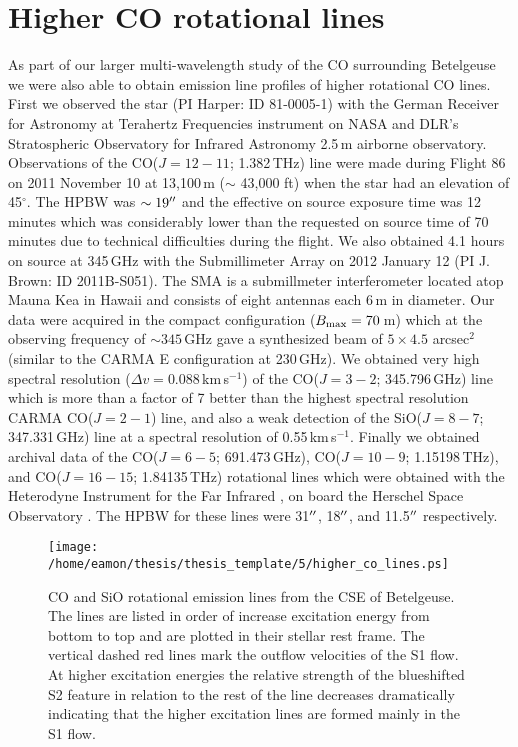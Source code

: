 \section{Higher CO rotational lines}\label{sec:5.10}
As part of our larger multi-wavelength study of the CO surrounding Betelgeuse we were also able to obtain emission line profiles of higher rotational CO lines. First we observed the star (PI Harper: ID 81-0005-1) with the German Receiver for Astronomy at Terahertz Frequencies \cite[GREAT;][]{guesten_2000} instrument on NASA and DLR's Stratospheric Observatory for Infrared Astronomy \cite[SOFIA;][]{becklin_2009} 2.5\,m airborne observatory. Observations of the  CO($J = 12-11$; 1.382\,THz) line were made during Flight 86 on 2011 November 10 at 13,100\,m ($\sim$ 43,000 ft) when the star had an elevation of 45$^{\circ}$. The HPBW was $\sim 19^{\prime\prime}$ and the effective on source exposure time was 12 minutes which was considerably lower than the requested on source time of 70 minutes due to technical difficulties during the flight. We also obtained 4.1 hours on source at 345\,GHz with the Submillimeter Array \cite[SMA;][]{blundell_2007} on 2012 January 12 (PI J. Brown: ID 2011B-S051). The SMA is a submillmeter interferometer located  atop Mauna Kea in Hawaii and consists of eight antennas each 6\,m in diameter. Our data were acquired in the compact configuration ($B_{\rm{max}}=70$\,m) which at the observing frequency of $\sim 345$\,GHz gave a synthesized beam of $5\times 4.5$ arcsec$^2$ (similar to the CARMA E configuration at 230\,GHz). We obtained very high spectral resolution ($\Delta v= 0.088$\,km\,s$^{-1}$) of the CO($J = 3-2$; 345.796\,GHz) line which is more than a factor of 7 better than the highest spectral resolution CARMA CO($J = 2-1$) line, and also a weak detection of the SiO($J = 8-7$; 347.331\,GHz) line at a spectral resolution of 0.55\,km\,s$^{-1}$. Finally we obtained archival data of the CO($J = 6-5$; 691.473\,GHz), CO($J = 10-9$; 1.15198\,THz), and CO($J = 16-15$; 1.84135\,THz) rotational lines which were obtained with the Heterodyne Instrument for the Far Infrared \cite[HIFI;][]{deGraauw_2010}, on board the Herschel Space Observatory \citep{pilbratt_2010}. The HPBW for these lines were 31$^{\prime\prime}$, 18$^{\prime\prime}$, and 11.5$^{\prime\prime}$ respectively.

\begin{figure}[!ht]
\centering 
\texttt{[image: /home/eamon/thesis/thesis\_template/5/higher\_co\_lines.ps]}
\caption[CO and SiO rotational emission lines from the CSE of Betelgeuse.]{CO and SiO rotational emission lines from the CSE of Betelgeuse. The lines are listed in order of increase excitation energy from bottom to top and are plotted in their stellar rest frame. The vertical dashed red lines mark the outflow velocities of the S1 flow. At higher excitation energies the relative strength of the blueshifted S2 feature in relation to the rest of the line decreases dramatically indicating that the higher excitation lines are formed mainly in the S1 flow.}
\label{fig:5.12}
\end{figure}

